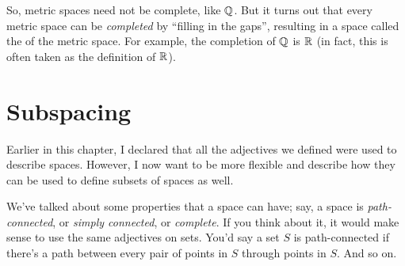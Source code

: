 So, metric spaces need not be complete, like $\mathbb Q$.
But it turns out that every metric space can be \emph{completed}
by ``filling in the gaps'', resulting in a space
called the  of the metric space.
For example, the completion of $\mathbb Q$ is $\mathbb R$ (in fact, this is often taken as the definition of $\mathbb R$).



\section{Subspacing}
Earlier in this chapter,
I declared that all the adjectives we defined were used to describe spaces.
However, I now want to be more flexible and describe
how they can be used to define subsets of spaces as well.

We've talked about some properties that a space can have;
say, a space is \emph{path-connected}, or \emph{simply connected}, or \emph{complete}.
If you think about it, it would make sense to use the same adjectives on sets.
You'd say a set $S$ is path-connected if there's a path between
every pair of points in $S$ through points in $S$. And so on.


